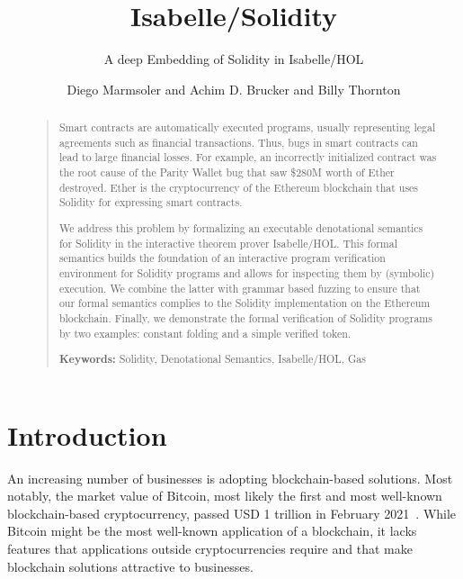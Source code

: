 \documentclass[10pt,DIV17,a4paper,abstract=true,twoside=semi,openright]
{scrreprt}
\title{Isabelle/Solidity}
\subtitle{A deep Embedding of Solidity in Isabelle/HOL}
\author{Diego Marmsoler\textsuperscript{\orcidlink{0000-0003-2859-7673}}  
        and 
        Achim D. Brucker\textsuperscript{\orcidlink{0000-0002-6355-1200}}
		and Billy Thornton}%
\newenvironment{frontmatter}{}{}
\begin{document}
\begin{frontmatter}
\maketitle
\begin{abstract}
  \begin{quote}
    Smart contracts are automatically executed programs, usually representing
    legal agreements such as financial transactions. Thus, bugs in smart
    contracts can lead to large financial losses. For example, an incorrectly
    initialized contract was the root cause of the Parity Wallet bug that saw
    \$280M worth of Ether destroyed. Ether is the cryptocurrency of the
    Ethereum blockchain that uses Solidity for expressing smart contracts.

    We address this problem by formalizing an executable denotational semantics
    for Solidity in the interactive theorem prover Isabelle/HOL.  This formal
    semantics builds the foundation of an interactive program verification
    environment for Solidity programs and allows for inspecting them by
    (symbolic) execution. We combine the latter with grammar based fuzzing to
    ensure that our formal semantics complies to the Solidity implementation on
    the Ethereum blockchain.  Finally, we demonstrate the formal verification of
    Solidity programs by two examples: constant folding and a simple verified
    token.

      \bigskip
      \noindent\textbf{Keywords:} {Solidity, Denotational Semantics,
          Isabelle/HOL, Gas} 
  \end{quote}
\end{abstract}

\tableofcontents
\cleardoublepage
\end{frontmatter}


\chapter{Introduction}
An increasing number of businesses is adopting blockchain-based solutions. Most
notably, the market value of Bitcoin, most likely the first and most well-known
blockchain-based cryptocurrency, passed USD 1 trillion in February
2021~\cite{coinmarket}. While Bitcoin might be the most well-known application
of a blockchain, it lacks features that applications outside cryptocurrencies
require and that make blockchain solutions attractive to businesses.
\end{document}
